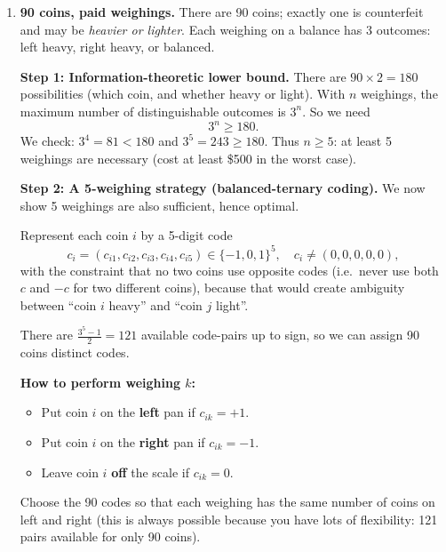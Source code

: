 \documentclass[11pt]{article}
\begin{document}
\begin{enumerate}[label=\textbf{\arabic*.}]
So \(R\) changes only by \(-2\) in the last case. Therefore \(\boxed{R \bmod 2 \text{ is invariant}}\).

At the end there is exactly one ball:
\begin{itemize}
\item If the last ball is red, then final \(R=1\) (odd).
\item If the last ball is blue, then final \(R=0\) (even).
\end{itemize}

\medskip
\noindent\textbf{Case 1: start with 14 red (even).}  
Parity stays even, so final \(R=0\). Last ball is \(\boxed{\text{blue}}\).

\medskip
\noindent\textbf{Case 2: start with 13 red (odd).}  
Parity stays odd, so final \(R=1\). Last ball is \(\boxed{\text{red}}\).

\hfill{\small\textit{Ref: A Practical Guide, Ch.\ 2, ``Last ball''}}

\item \textbf{90 coins, paid weighings.}
There are 90 coins; exactly one is counterfeit and may be \emph{heavier or lighter}. Each weighing on a balance has 3 outcomes: left heavy, right heavy, or balanced.

\medskip
\noindent\textbf{Step 1: Information-theoretic lower bound.}  
There are \(90\times 2 = 180\) possibilities (which coin, and whether heavy or light).
With \(n\) weighings, the maximum number of distinguishable outcomes is \(3^n\). So we need
\[
3^n \ge 180.
\]
We check: \(3^4=81<180\) and \(3^5=243\ge 180\).  
Thus \(\boxed{n\ge 5}\): at least 5 weighings are necessary (cost at least \$500 in the worst case).

\medskip
\noindent\textbf{Step 2: A 5-weighing strategy (balanced-ternary coding).}  
We now show 5 weighings are also sufficient, hence optimal.

Represent each coin \(i\) by a 5-digit code
\[
c_i=(c_{i1},c_{i2},c_{i3},c_{i4},c_{i5})\in\{-1,0,1\}^5,\quad c_i\neq (0,0,0,0,0),
\]
with the constraint that no two coins use opposite codes (i.e.\ never use both \(c\) and \(-c\) for two different coins), because that would create ambiguity between ``coin \(i\) heavy'' and ``coin \(j\) light''.

There are \(\frac{3^5-1}{2}=121\) available code-pairs up to sign, so we can assign 90 coins distinct codes.

\medskip
\noindent\textbf{How to perform weighing \(k\):}
\begin{itemize}
\item Put coin \(i\) on the \textbf{left} pan if \(c_{ik}=+1\).
\item Put coin \(i\) on the \textbf{right} pan if \(c_{ik}=-1\).
\item Leave coin \(i\) \textbf{off} the scale if \(c_{ik}=0\).
\end{itemize}
Choose the 90 codes so that each weighing has the same number of coins on left and right (this is always possible because you have lots of flexibility: 121 pairs available for only 90 coins).


\end{enumerate}
\end{document}
